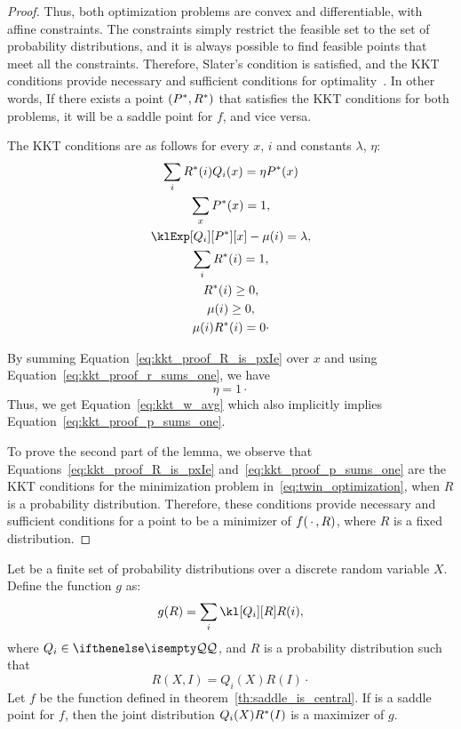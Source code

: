 \begin{proof}
    Thus, both optimization problems are convex and differentiable, with affine constraints.
    The constraints simply restrict the feasible set to the set of probability distributions, and it is always possible
    to find feasible points that meet all the constraints.
    Therefore, Slater’s condition is satisfied, and the KKT conditions provide necessary
    and sufficient conditions for optimality~\cite{0521833787}.
    In other words, If there exists a point $(P^{*}, R^{*})$ that satisfies the KKT conditions for both problems, it will be a
    saddle point for $f$, and vice versa.

    The KKT conditions are as follows for every $x$, $i$ and constants $\lambda$, $\eta$:
    \begin{gather}
        \label{eq:kkt_proof_R_is_pxIe}
        \sum_i \saddR(i) Q_i(x) = \eta \saddP(x) \\
        \label{eq:kkt_proof_p_sums_one}
        \sum_{x} \saddP(x) = 1, \\
        \nonumber
        \klExp[Q_i][\saddP][x] - \mu(i) = \lambda, \\
        \label{eq:kkt_proof_r_sums_one}
        \sum_i \saddR(i) = 1, \\
        \nonumber
        \saddR(i) \geq 0, \\
        \nonumber
        \mu(i) \geq 0, \\
        \nonumber
        \mu(i) \saddR(i) = 0 \cdot
    \end{gather}

    By summing Equation~\ref{eq:kkt_proof_R_is_pxIe} over $x$ and using Equation~\ref{eq:kkt_proof_r_sums_one},
    we have
    \[
        \eta = 1 \cdot
    \]
    Thus, we get Equation~\ref{eq:kkt_w_avg} which also implicitly implies Equation~\ref{eq:kkt_proof_p_sums_one}.

    To prove the second part of the lemma,
    we observe that Equations~\ref{eq:kkt_proof_R_is_pxIe} and~\ref{eq:kkt_proof_p_sums_one} are the KKT conditions
    for the minimization problem in~\ref{eq:twin_optimization}, when $R$ is a probability distribution.
    Therefore, these conditions provide necessary and sufficient conditions for a point
    to be a minimizer of $f(\, \cdot \,,R)$, where $R$ is a fixed distribution.
\end{proof}

\begin{lemma}
    \label{lm:c-is-maximizer}
    Let \setQ be a finite set of probability distributions over a discrete random variable $X$.
    Define the function $g$ as:
    \[
        g(R) = \sum_i \kl[Q_i][R] R(i),
    \]
    where $Q_i \in \setQ$, and $R$ is a probability distribution such that \[R(X, I) = Q_i(X)R(I) \cdot\]
    Let $f$ be the function defined in theorem~\ref{th:saddle_is_central}.
    If \saddle is a saddle point for $f$, then the joint distribution $Q_i(X)R^{*}(I)$ is a maximizer of $g$.
\end{lemma}

